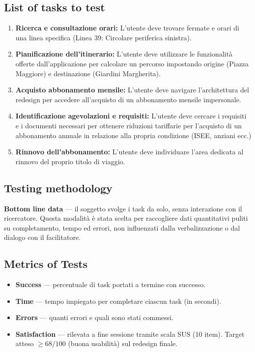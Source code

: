 ﻿\documentclass[11pt,a4paper]{article}
\begin{document}
\subsection*{List of tasks to test}
\begin{tcolorbox}[base]
\begin{enumerate}[leftmargin=*,itemsep=4pt]
  \item \textbf{Ricerca e consultazione orari:} L'utente deve
  trovare fermate e orari di una linea specifica (Linea 39:
  Circolare periferica sinistra).
  \item \textbf{Pianificazione dell'itinerario:} L'utente deve
  utilizzare le funzionalità offerte dall'applicazione per
  calcolare un percorso impostando origine (Piazza Maggiore) e
  destinazione (Giardini Margherita).
  \item \textbf{Acquisto abbonamento mensile:} L'utente
  deve navigare l'architettura del redesign per accedere
  all'acquisto di un abbonamento mensile impersonale.
  \item \textbf{Identificazione agevolazioni e requisiti:}
  L'utente deve cercare i requisiti e i documenti necessari per
  ottenere riduzioni tariffarie per l'acquisto di un abbonamento
  annuale in relazione alla propria condizione (ISEE, anziani ecc.)
  \item \textbf{Rinnovo dell'abbonamento:} L'utente
  deve individuare l'area dedicata al rinnovo del proprio titolo
  di viaggio.
\end{enumerate}
\end{tcolorbox}

\vspace{0.2cm}

\subsection*{Testing methodology}
\textbf{Bottom line data} --- il soggetto
svolge i task da solo, senza interazione con il ricercatore.
Questa modalità è stata scelta per raccogliere dati
quantitativi puliti su completamento, tempo ed errori,
non influenzati dalla verbalizzazione o dal dialogo con
il facilitatore.

\vspace{0.2cm}

\subsection*{Metrics of Tests}
\begin{itemize}[leftmargin=*,itemsep=3pt]
  \item \textbf{Success} --- percentuale di task portati
  a termine con successo.
  \item \textbf{Time} --- tempo impiegato per completare
  ciascun task (in secondi).
  \item \textbf{Errors} --- quanti errori e quali sono stati commessi.
  \item \textbf{Satisfaction} --- rilevata a fine sessione
  tramite scala SUS (10 item). Target atteso $\ge 68/100$
  (buona usabilit\`a) sul redesign finale.
\end{itemize}
\end{document}

